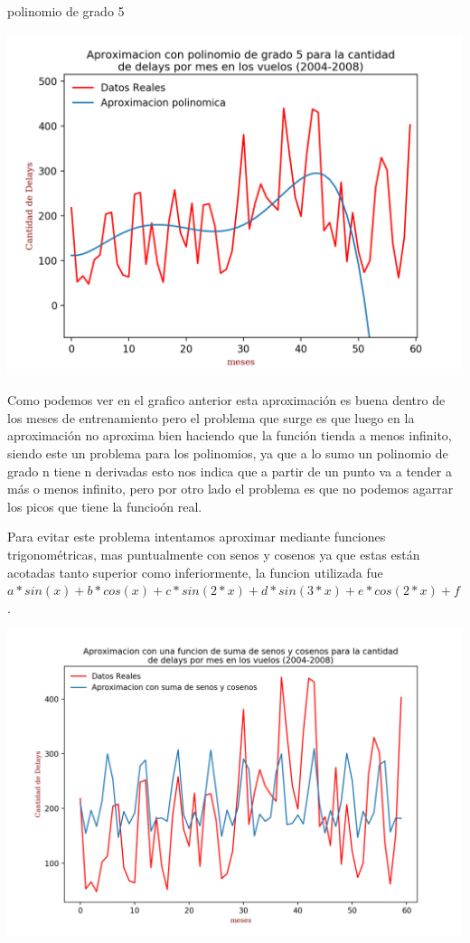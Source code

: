 \documentclass{endm}
\begin{document}
	\begin{center}
	\caption{polinomio de grado 5}
	\includegraphics[scale=0.7]{imagenes/delaysPolinomio.png}
	\end{center}

Como podemos ver en el grafico anterior esta aproximaci\'on es buena dentro de los meses de entrenamiento pero el problema que surge es que luego en la aproximaci\'on no aproxima bien haciendo que la funci\'on tienda a menos infinito, siendo este un problema para los polinomios, ya que a lo sumo un polinomio de grado n tiene n derivadas esto nos indica que a partir de un punto va a tender a m\'as o  menos infinito, pero por otro lado el problema es que no podemos agarrar los picos que tiene la funcio\'on real.

Para evitar este problema intentamos aproximar mediante funciones trigonom\'etricas, mas puntualmente con senos y cosenos ya que estas están acotadas tanto superior como inferiormente, la funcion utilizada fue $a*sin(x)+ b*cos(x)+c*sin(2*x)+ d*sin(3*x)+ e*cos(2*x)+f$.

	\begin{center}
	\includegraphics[scale=0.6]{imagenes/senosCosenos.png}
	\end{center}
\end{document}
